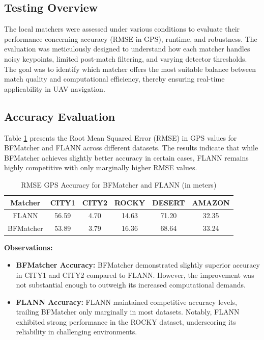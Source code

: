 \subsection{Testing Overview}

The local matchers were assessed under various conditions to evaluate their performance concerning accuracy (RMSE in GPS), runtime, and robustness. The evaluation was meticulously designed to understand how each matcher handles noisy keypoints, limited post-match filtering, and varying detector thresholds. The goal was to identify which matcher offers the most suitable balance between match quality and computational efficiency, thereby ensuring real-time applicability in UAV navigation.

\subsection{Accuracy Evaluation}

Table \ref{tab:flann_bf_comparison_acc} presents the Root Mean Squared Error (RMSE) in GPS values for BFMatcher and FLANN across different datasets. The results indicate that while BFMatcher achieves slightly better accuracy in certain cases, FLANN remains highly competitive with only marginally higher RMSE values.

\begin{table}[H]
    \centering
    \caption{RMSE GPS Accuracy for BFMatcher and FLANN (in meters)}
    \label{tab:flann_bf_comparison_acc}
    \begin{tabular}{|c|c|c|c|c|c|}
    \hline
    \textbf{Matcher} & \textbf{CITY1} & \textbf{CITY2} & \textbf{ROCKY} & \textbf{DESERT} & \textbf{AMAZON} \\ \hline
    FLANN          & 56.59           & 4.70           & 14.63          & 71.20           & 32.35           \\ \hline
    BFMatcher      & 53.89           & 3.79           & 16.36          & 68.64           & 33.24           \\ \hline
    \end{tabular}
\end{table}

\textbf{Observations:}
\begin{itemize}
    \item \textbf{BFMatcher Accuracy:} BFMatcher demonstrated slightly superior accuracy in CITY1 and CITY2 compared to FLANN. However, the improvement was not substantial enough to outweigh its increased computational demands.
    \item \textbf{FLANN Accuracy:} FLANN maintained competitive accuracy levels, trailing BFMatcher only marginally in most datasets. Notably, FLANN exhibited strong performance in the ROCKY dataset, underscoring its reliability in challenging environments.
\end{itemize}

